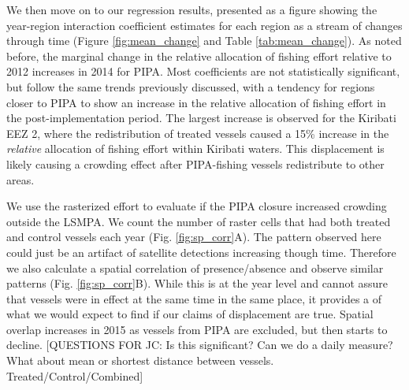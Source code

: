 \documentclass[11pt,english]{article}
\begin{document}
We then move on to our regression results, presented as a figure showing
the year-region interaction coefficient estimates for each region as a
stream of changes through time (Figure \ref{fig:mean_change} and Table
\ref{tab:mean_change}). As noted before, the marginal change in the
relative allocation of fishing effort relative to 2012 increases in 2014
for PIPA. Most coefficients are not statistically significant, but
follow the same trends previously discussed, with a tendency for regions
closer to PIPA to show an increase in the relative allocation of fishing
effort in the post-implementation period. The largest increase is
observed for the Kiribati EEZ 2, where the redistribution of treated
vessels caused a 15\% increase in the \emph{relative} allocation of
fishing effort within Kiribati waters. This displacement is likely
causing a crowding effect after PIPA-fishing vessels redistribute to
other areas.

We use the rasterized effort to evaluate if the PIPA closure increased
crowding outside the LSMPA. We count the number of raster cells that
had both treated and control vessels each year (Fig.
\ref{fig:sp_corr}A). The pattern observed here could just be an artifact
of satellite detections increasing though time. Therefore we also
calculate a spatial correlation of presence/absence and observe similar
patterns (Fig. \ref{fig:sp_corr}B). While this is at the year level and
cannot assure that vessels were in effect at the same time in the same
place, it provides a of what we would expect to
find if our claims of displacement are true. Spatial overlap increases
in 2015 as vessels from PIPA are excluded, but then starts to decline. [QUESTIONS FOR JC: Is this significant? Can we do a daily measure? What about mean or shortest distance between vessels. Treated/Control/Combined]
\end{document}
